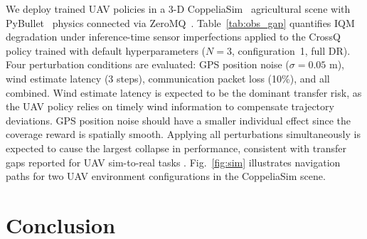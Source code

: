 \documentclass{article}
\begin{document}
We deploy trained UAV policies in a 3-D CoppeliaSim~\citep{coppeliaSim2013} agricultural scene with PyBullet~\citep{coumans2021pybullet} physics connected via ZeroMQ~\citep{ZeroMQ}. Table~\ref{tab:obs_gap} quantifies IQM degradation under inference-time sensor imperfections applied to the CrossQ policy trained with default hyperparameters ($N = 3$, configuration~1, full DR). Four perturbation conditions are evaluated: GPS position noise ($\sigma = 0.05$ m), wind estimate latency (3 steps), communication packet loss (10\%), and all combined. Wind estimate latency is expected to be the dominant transfer risk, as the UAV policy relies on timely wind information to compensate trajectory deviations. GPS position noise should have a smaller individual effect since the coverage reward is spatially smooth. Applying all perturbations simultaneously is expected to cause the largest collapse in performance, consistent with transfer gaps reported for UAV sim-to-real tasks \citep{peng2018sim2real, akkaya2019solving}. Fig.~\ref{fig:sim} illustrates navigation paths for two UAV environment configurations in the CoppeliaSim scene.


\section{Conclusion}
\label{sec:con}
\end{document}

